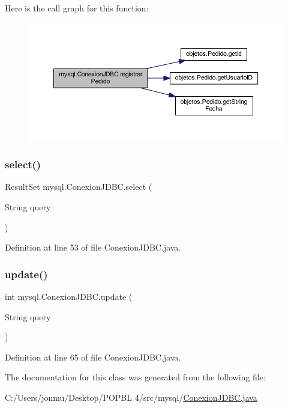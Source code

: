 Here is the call graph for this function\+:
\nopagebreak
\begin{figure}[H]
\begin{center}
\leavevmode
\includegraphics[width=350pt]{classmysql_1_1_conexion_j_d_b_c_a6d8f0cd0e2046952d9771d379c16562a_cgraph}
\end{center}
\end{figure}
\mbox{\label{classmysql_1_1_conexion_j_d_b_c_a77f0c70a90a3e174114586b131f10909}} 
\subsubsection{\texorpdfstring{select()}{select()}}
{\footnotesize\ttfamily Result\+Set mysql.\+Conexion\+J\+D\+B\+C.\+select (\begin{DoxyParamCaption}\item[{String}]{query }\end{DoxyParamCaption})}



Definition at line 53 of file Conexion\+J\+D\+B\+C.\+java.

\mbox{\label{classmysql_1_1_conexion_j_d_b_c_a5a0abe91b83748401d0a630817c15e83}} 
\subsubsection{\texorpdfstring{update()}{update()}}
{\footnotesize\ttfamily int mysql.\+Conexion\+J\+D\+B\+C.\+update (\begin{DoxyParamCaption}\item[{String}]{query }\end{DoxyParamCaption})}



Definition at line 65 of file Conexion\+J\+D\+B\+C.\+java.



The documentation for this class was generated from the following file\+:\begin{DoxyCompactItemize}
\item 
C\+:/\+Users/jonmu/\+Desktop/\+P\+O\+P\+B\+L 4/src/mysql/\mbox{\hyperlink{_conexion_j_d_b_c_8java}{Conexion\+J\+D\+B\+C.\+java}}\end{DoxyCompactItemize}
